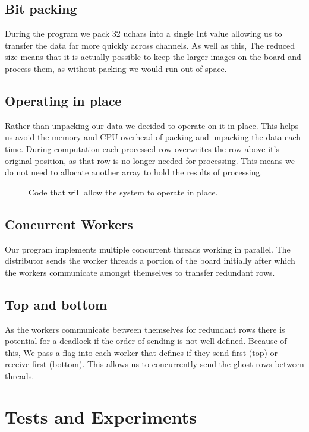 \documentclass{article}
\begin{document}
    \subsection{Bit packing}
    During the program we pack 32 uchars into a single Int value allowing us to transfer the data far more quickly across channels. As well as this, The reduced size means that it is actually possible to keep the larger images on the board and process them, as without packing we would run out of space.
    \subsection{Operating in place}
    Rather than unpacking our data we decided to operate on it in place. This helps us avoid the memory and CPU overhead of packing and unpacking the data each time. During computation each processed row overwrites the row above it's original position, as that row is no longer needed for processing. This means we do not need to allocate another array to hold the results of processing.

    \begin{figure}[h]
        \begin{center}
            
            \caption{Code that will allow the system to operate in place. }
            \label{fig:inplace}
        \end{center}
    \end{figure}
    
    
    \subsection{Concurrent Workers}
    Our program implements multiple concurrent threads working in parallel. The distributor sends the worker threads a portion of the board initially after which the workers communicate amongst themselves to transfer redundant rows.
    \subsection{Top and bottom}
    As the workers communicate between themselves for redundant rows there is potential for a deadlock if the order of sending is not well defined. Because of this, We pass a flag into each worker that defines if they send first (top) or receive first (bottom). This  allows us to concurrently send the ghost rows between threads.


    \newpage
    \section{Tests and Experiments}
    
\end{document}
